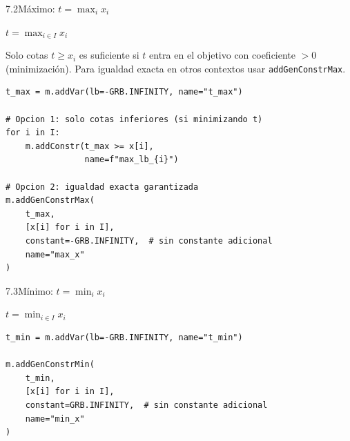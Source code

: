 \documentclass[10pt,a4paper]{article}
\newlength{\mathcolw}
\newlength{\codecolw}
\newcommand{\entryheader}[1]{%
  \needspace{5cm}%
  \vspace{6pt}%
  \noindent%
  \begin{tcolorbox}[
    colback=subsecbg!18,
    colframe=subsecbg!45,
    sharp corners, boxrule=0.4pt,
    left=5pt, right=5pt, top=2pt, bottom=2pt,
    fontupper=\small\bfseries\sffamily,
  ]
  #1
  \end{tcolorbox}%
  \vspace{2pt}%
}
\newcommand{\py}[1]{\texttt{\small #1}}
\begin{document}
\vspace{4pt}

\entryheader{7.2\quad M\'aximo: $t = \max_i x_i$}
\noindent
\begin{minipage}[t]{\mathcolw}
    \begin{tcolorbox}[mathbox]
        $t = \displaystyle\max_{i \in I} x_i$
    \end{tcolorbox}
    \vspace{2pt}
    \begin{tcolorbox}[notebox]
        Solo cotas $t \geq x_i$ es suficiente si $t$ entra en el objetivo con coeficiente $> 0$ (minimizaci\'on). Para igualdad exacta en otros contextos usar \py{addGenConstrMax}.
    \end{tcolorbox}
\end{minipage}\hspace{0.02\textwidth}%
\begin{minipage}[t]{\codecolw}
    \begin{lstlisting}[style=gurobipy]
t_max = m.addVar(lb=-GRB.INFINITY, name="t_max")

# Opcion 1: solo cotas inferiores (si minimizando t)
for i in I:
    m.addConstr(t_max >= x[i],
                name=f"max_lb_{i}")

# Opcion 2: igualdad exacta garantizada
m.addGenConstrMax(
    t_max,
    [x[i] for i in I],
    constant=-GRB.INFINITY,  # sin constante adicional
    name="max_x"
)
\end{lstlisting}
\end{minipage}

\vspace{4pt}

\entryheader{7.3\quad M\'inimo: $t = \min_i x_i$}
\noindent
\begin{minipage}[t]{\mathcolw}
    \begin{tcolorbox}[mathbox]
        $t = \displaystyle\min_{i \in I} x_i$
    \end{tcolorbox}
\end{minipage}\hspace{0.02\textwidth}%
\begin{minipage}[t]{\codecolw}
    \begin{lstlisting}[style=gurobipy]
t_min = m.addVar(lb=-GRB.INFINITY, name="t_min")

m.addGenConstrMin(
    t_min,
    [x[i] for i in I],
    constant=GRB.INFINITY,  # sin constante adicional
    name="min_x"
)
\end{lstlisting}
\end{minipage}
\end{document}
